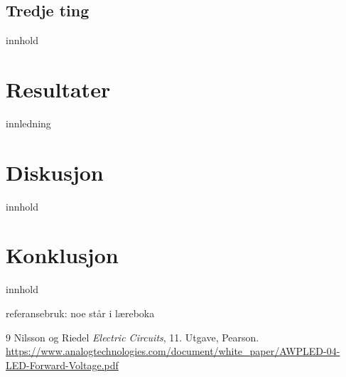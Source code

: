 \documentclass[11pt,a4paper,twocolumn]{article}
\begin{document}
\subsection{Tredje ting}
innhold

\section{Resultater}
innledning

\section{Diskusjon}
innhold

\section{Konklusjon}
innhold

referansebruk: noe står i læreboka \cite{laerebok}

\begin{thebibliography}{9}
Nilsson og Riedel \textit{Electric Circuits}, 11. Utgave, Pearson.
\url{https://www.analogtechnologies.com/document/white_paper/AWPLED-04-LED-Forward-Voltage.pdf}
\end{thebibliography}
\end{document}
